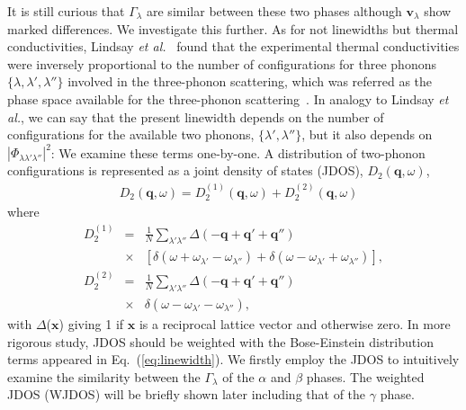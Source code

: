 \documentclass[twocolumn,amsmath,amssymb,a4paper,prb,superscriptaddress,floatfix]{revtex4-1}
\begin{document}
It is still curious that $\Gamma_\lambda$ are similar between these two phases
although $\mathbf{v}_\lambda$ show marked differences.  We investigate this
further. As for not linewidths but thermal conductivities, Lindsay {\it et
al.}~\cite{Lindsay} found that the experimental thermal conductivities were
inversely proportional to the number of configurations for three phonons
$\{\lambda, \lambda', \lambda''\}$ involved in the three-phonon scattering,
which was referred as the phase space available for the three-phonon
scattering~\cite{Lindsay}.  In analogy to Lindsay {\it et al.}, we can say that
the present linewidth depends on the number of configurations for the available
two phonons, $\{\lambda', \lambda''\}$, but it also depends on
$|\Phi_{\lambda\lambda'\lambda''}|^2$: We examine these terms
one-by-one. A distribution of two-phonon configurations is represented as a
joint density of states (JDOS),
${D_2(\mathbf{q},\omega)}$,  
\begin{align}
 \label{eq:jdos}
 &D_2(\mathbf{q},\omega) = D_2^{(1)}(\mathbf{q},\omega) +  D_2^{(2)}(\mathbf{q},\omega)
\end{align}
where 
\begin{eqnarray*}
	D_2^{(1)} & = & \frac{1}{N} \sum_{\lambda'\lambda''}\Delta(-\mathbf{q} + \mathbf{q'} + \mathbf{q''}) \nonumber \\
								   & \times & [\delta(\omega + \omega_{\lambda'} - \omega_{\lambda''}) + \delta(\omega - \omega_{\lambda'} + \omega_{\lambda''})],\\
	D_2^{(2)} & = & \frac{1}{N} \sum_{\lambda'\lambda''}\Delta(-\mathbf{q} + \mathbf{q'} + \mathbf{q''}) \nonumber \\
								   & \times & \delta(\omega - \omega_{\lambda'} - \omega_{\lambda''}),
\end{eqnarray*}
with $\Delta$($\mathbf{x}$) giving 1 if $\mathbf{x}$ is a reciprocal lattice
vector and otherwise zero.  In more rigorous study, JDOS should be weighted with
the Bose-Einstein distribution terms appeared in Eq.~(\ref{eq:linewidth}).  We
firstly employ the JDOS to intuitively examine the similarity between the
$\Gamma_{\lambda}$ of the $\alpha$ and $\beta$ phases. The weighted JDOS (WJDOS)
will be briefly shown later including that of the $\gamma$ phase. 
\end{document}
